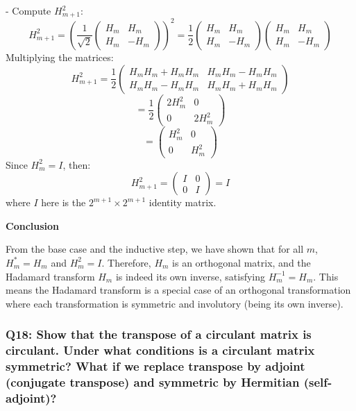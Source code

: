 \documentclass[8pt]{article}
\begin{document}
{- Compute \(H_{m+1}^2\):
  \[
  H_{m+1}^2 = \left(\frac{1}{\sqrt{2}} \begin{pmatrix} H_m & H_m \\ H_m & -H_m \end{pmatrix}\right)^2 = \frac{1}{2} \begin{pmatrix} H_m & H_m \\ H_m & -H_m \end{pmatrix} \begin{pmatrix} H_m & H_m \\ H_m & -H_m \end{pmatrix}
  \]
  Multiplying the matrices:
  \[
  H_{m+1}^2 = \frac{1}{2} \begin{pmatrix} H_m H_m + H_m H_m & H_m H_m - H_m H_m \\ H_m H_m - H_m H_m & H_m H_m + H_m H_m \end{pmatrix}
  \]
  \[
  = \frac{1}{2} \begin{pmatrix} 2H_m^2 & 0 \\ 0 & 2H_m^2 \end{pmatrix}
  \]
  \[
  = \begin{pmatrix} H_m^2 & 0 \\ 0 & H_m^2 \end{pmatrix}
  \]
  Since \(H_m^2 = I\), then:
  \[
  H_{m+1}^2 = \begin{pmatrix} I & 0 \\ 0 & I \end{pmatrix} = I
  \]
  where \(I\) here is the \(2^{m+1} \times 2^{m+1}\) identity matrix.

\textbf{Conclusion}

From the base case and the inductive step, we have shown that for all \(m\), \(H_m^* = H_m\) and \(H_m^2 = I\). Therefore, \(H_m\) is an orthogonal matrix, and the Hadamard transform \(H_m\) is indeed its own inverse, satisfying \(H_m^{-1} = H_m\). This means the Hadamard transform is a special case of an orthogonal transformation where each transformation is symmetric and involutory (being its own inverse).

\subsubsection*{Q18:
Show that the transpose of a circulant matrix is circulant. Under what conditions is a circulant matrix symmetric? What if we replace transpose by adjoint (conjugate transpose) and symmetric by Hermitian (self-adjoint)?}

}
\end{document}
